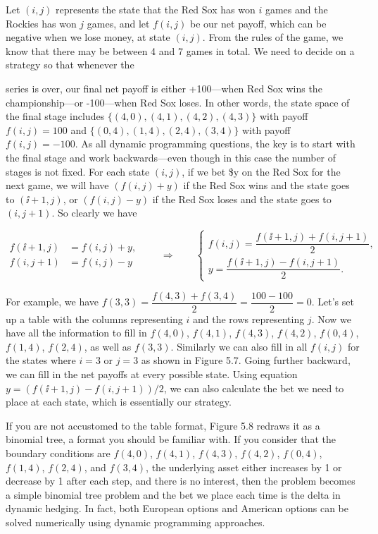 \begin{solution}
Let $(i,j)$ represents the state that the Red Sox has won $i$ games and the Rockies
has won $j$ games, and let $f(i,j)$ be our net payoff, which can be negative when we
lose money, at state $(i,j)$. From the rules of the game, we know that there may be
between 4 and 7 games in total. We need to decide on a strategy so that whenever the


series is over, our final net payoff is either +100---when Red Sox wins the\linebreak
championship---or -100---when Red Sox loses. In other words, the state space of the
final stage includes $\{(4,0),(4,1),(4,2),(4,3)\}$ with payoff $f(i,j)=100$ and
$\{(0,4),(1,4),(2,4),(3,4)\}$ with payoff $f(i,j)=-100$. As all dynamic
programming questions, the key is to start with the final stage and work
backwards---even though in this case the number of stages is not fixed. For each
state $(i,j)$, if we bet \$y on the Red Sox for the next game, we will have
$(f(i,j)+y)$ if the Red Sox wins and the state goes to $(\ii+1,j)$, or
$(f(i,j)-y)$ if the Red Sox loses and the state goes to $(i,j+1)$. So clearly we
have

\[
\begin{aligned}
f(\ii+1,j)&=f(i,j)+y,\\
f(i,j+1)&=f(i,j)-y
\end{aligned}
\qquad\Rightarrow\qquad
\begin{cases}
f(i,j)=\dfrac{f(\ii+1,j)+f(i,j+1)}{2},\\[6pt]
y=\dfrac{f(\ii+1,j)-f(i,j+1)}{2}.
\end{cases}
\]

For example, we have
$f(3,3)=\dfrac{f(4,3)+f(3,4)}{2}=\dfrac{100-100}{2}=0$. Let's set up a table
with the columns representing $i$ and the rows representing $j$. Now we have all the
information to fill in $f(4,0)$, $f(4,1)$, $f(4,3)$, $f(4,2)$, $f(0,4)$, $f(1,4)$,
$f(2,4)$, as well as $f(3,3)$. Similarly we can also fill in all $f(i,j)$ for the
states where $i=3$ or $j=3$ as shown in Figure 5.7. Going further backward, we can
fill in the net payoffs at every possible state. Using equation
$y=(f(\ii+1,j)-f(i,j+1))/2$, we can also calculate the bet we need to place at each
state, which is essentially our strategy.

If you are not accustomed to the table format, Figure 5.8 redraws it as a binomial
tree, a format you should be familiar with. If you consider that the boundary
conditions are $f(4,0)$, $f(4,1)$, $f(4,3)$, $f(4,2)$, $f(0,4)$, $f(1,4)$, $f(2,4)$,
and $f(3,4)$, the underlying asset either increases by 1 or decrease by 1 after
each step, and there is no interest, then the problem becomes a simple binomial tree
problem and the bet we place each time is the delta in dynamic hedging. In fact,
both European options and American options can be solved numerically using dynamic
programming approaches.
\end{solution}
